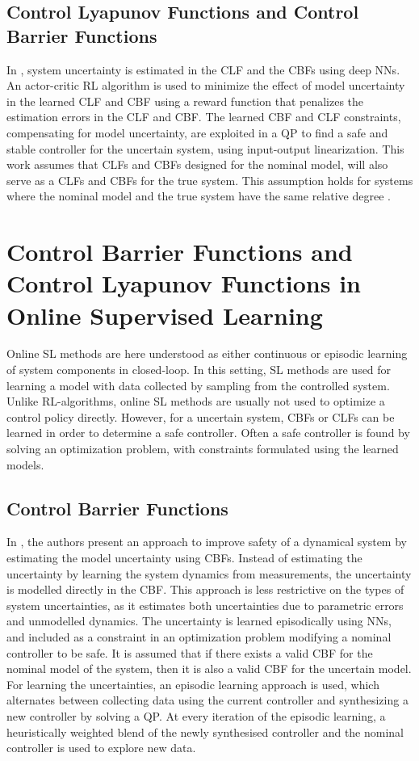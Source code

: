 \documentclass[3p,times,procedia]{elsarticle}
\begin{document}
\subsection{Control Lyapunov Functions and Control Barrier Functions}\label{sec:rl-clf-cbf}
In \cite{Choi2020}, system uncertainty is estimated in the CLF and the CBFs using deep NNs. An actor-critic RL algorithm is used to minimize the effect of model uncertainty in the learned CLF and CBF using a reward function that penalizes the estimation errors in the CLF and CBF. The learned CBF and CLF constraints, compensating for model uncertainty, are exploited in a QP to find a safe and stable controller for the uncertain system, using input-output linearization. This work assumes that CLFs and CBFs designed for the nominal model, will also serve as a CLFs and CBFs for the true system. This assumption holds for systems where the nominal model and the true system have the same relative degree \cite{Taylor2019a}.

\section{Control Barrier Functions and Control Lyapunov Functions in Online Supervised Learning}\label{sec:online_supervised}
Online SL methods are here understood as either continuous or episodic learning of system components in closed-loop. In this setting, SL methods are used for learning a model with data collected by sampling from the controlled system. Unlike RL-algorithms, online SL methods are usually not used to optimize a control policy directly. However, for a uncertain system, CBFs or CLFs can be learned in order to determine a safe controller. Often a safe controller is found by solving an optimization problem, with constraints formulated using the learned models.


\subsection{Control Barrier Functions}\label{sec:online-cbf}
In \cite{Taylor2019a}, the authors present an approach to improve safety of a dynamical system by estimating the model uncertainty using CBFs. Instead of estimating the uncertainty by learning the system dynamics from measurements, the uncertainty is modelled directly in the CBF. This approach is less restrictive on the types of system uncertainties, as it estimates both uncertainties due to parametric errors and unmodelled dynamics. The uncertainty is learned episodically using NNs, and included as a constraint in an optimization problem modifying a nominal controller to be safe. It is assumed that if there exists a valid CBF for the nominal model of the system, then it is also a valid CBF for the uncertain model. For learning the uncertainties, an episodic learning approach is used, which alternates between collecting data using the current controller and synthesizing a new controller by solving a QP. At every iteration of the episodic learning, a heuristically weighted blend of the newly synthesised controller and the nominal controller is used to explore new data.  
\end{document}

